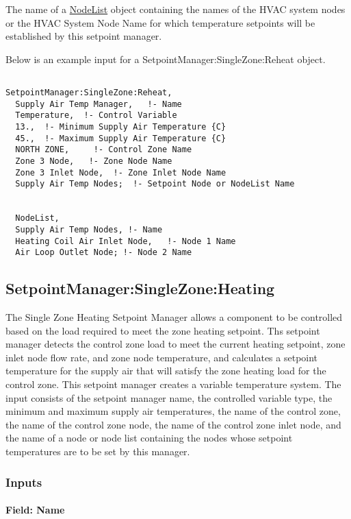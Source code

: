 The name of a \hyperref[nodelist]{NodeList} object containing the names of the HVAC system nodes or the HVAC System Node Name for which temperature setpoints will be established by this setpoint manager.

Below is an example input for a SetpointManager:SingleZone:Reheat object.

\begin{lstlisting}

SetpointManager:SingleZone:Reheat,
  Supply Air Temp Manager,   !- Name
  Temperature,  !- Control Variable
  13.,  !- Minimum Supply Air Temperature {C}
  45.,  !- Maximum Supply Air Temperature {C}
  NORTH ZONE,     !- Control Zone Name
  Zone 3 Node,   !- Zone Node Name
  Zone 3 Inlet Node,  !- Zone Inlet Node Name
  Supply Air Temp Nodes;  !- Setpoint Node or NodeList Name


  NodeList,
  Supply Air Temp Nodes, !- Name
  Heating Coil Air Inlet Node,   !- Node 1 Name
  Air Loop Outlet Node; !- Node 2 Name
\end{lstlisting}

\subsection{SetpointManager:SingleZone:Heating}\label{setpointmanagersinglezoneheating}

The Single Zone Heating Setpoint Manager allows a component to be controlled based on the load required to meet the zone heating setpoint. Ths setpoint manager detects the control zone load to meet the current heating setpoint, zone inlet node flow rate, and zone node temperature, and calculates a setpoint temperature for the supply air that will satisfy the zone heating load for the control zone. This setpoint manager creates a variable temperature system. The input consists of the setpoint manager name, the controlled variable type, the minimum and maximum supply air temperatures, the name of the control zone, the name of the control zone node, the name of the control zone inlet node, and the name of a node or node list containing the nodes whose setpoint temperatures are to be set by this manager.

\subsubsection{Inputs}\label{inputs-4-030}

\paragraph{Field: Name}\label{field-name-4-026}

